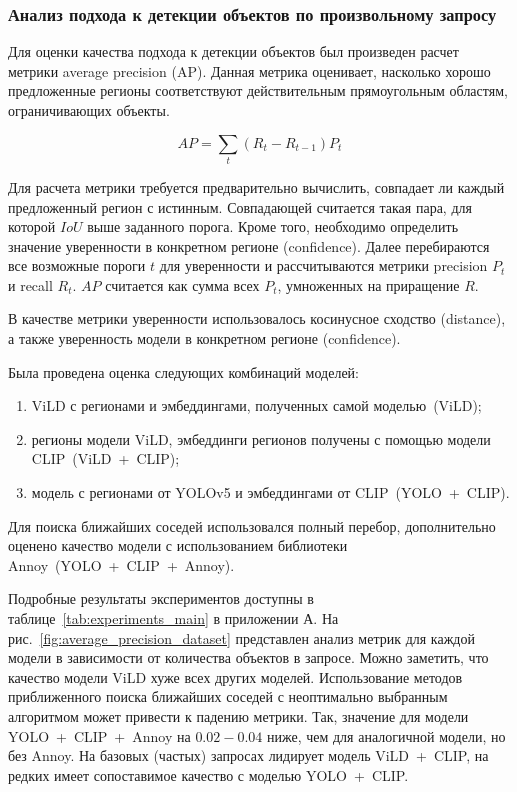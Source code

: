\documentclass[a4paper,14pt]{article}
\begin{document}
    \subsubsection{Анализ подхода к детекции объектов по произвольному запросу} \label{fsod_exp}

	Для оценки качества подхода к детекции объектов был произведен расчет метрики average precision (AP).
	Данная метрика оценивает, насколько хорошо предложенные регионы соответствуют действительным прямоугольным областям, ограничивающих объекты.
	
	$$ AP = \sum_{t} (R_t - R_{t - 1}) P_t $$
	
	Для расчета метрики требуется предварительно вычислить, совпадает ли каждый предложенный регион с истинным.
	Совпадающей считается такая пара, для которой $IoU$ выше заданного порога.
	Кроме того, необходимо определить значение уверенности в конкретном регионе (confidence).
	Далее перебираются все возможные пороги $t$ для уверенности и рассчитываются метрики precision $P_t$ и recall $R_t$.
	$AP$ считается как сумма всех $P_t$, умноженных на приращение $R$.
	
	В качестве метрики уверенности использовалось косинусное сходство (distance), а также уверенность модели в конкретном регионе (confidence).
	
	Была проведена оценка следующих комбинаций моделей:
	\begin{enumerate}
		[1)]
		\itemsep0em
		\item ViLD с регионами и эмбеддингами, полученных самой моделью~(ViLD);
		\item регионы модели ViLD, эмбеддинги регионов получены с помощью модели CLIP~(ViLD~+~CLIP);
		\item модель с регионами от YOLOv5 и эмбеддингами от CLIP~(YOLO~+~CLIP).
	\end{enumerate}
	 Для поиска ближайших соседей использовался полный перебор, дополнительно оценено качество модели с использованием библиотеки Annoy~(YOLO~+~CLIP~+~Annoy).
	
	
	Подробные результаты экспериментов доступны в таблице~\ref{tab:experiments_main} в приложении А.
	На рис.~\ref{fig:average_precision_dataset} представлен анализ метрик для каждой модели в зависимости от количества объектов в запросе.
	Можно заметить, что качество модели ViLD хуже всех других моделей.
	Использование методов приближенного поиска ближайших соседей с неоптимально выбранным алгоритмом может привести к падению метрики.
	Так, значение для модели YOLO~+~CLIP~+~Annoy на $0.02 - 0.04$ ниже, чем для аналогичной модели, но без Annoy.
	На базовых (частых) запросах лидирует модель ViLD~+~CLIP, на редких имеет сопоставимое качество с моделью YOLO~+~CLIP.
	
\end{document}
